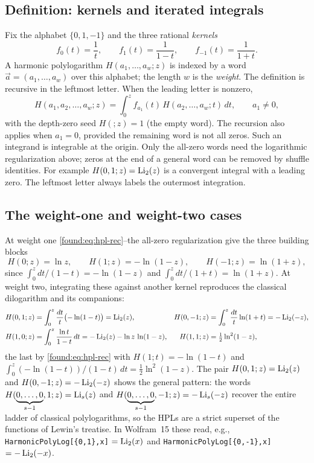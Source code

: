 \subsection{Definition: kernels and iterated integrals}

Fix the alphabet $\{0,1,-1\}$ and the three rational \emph{kernels}
\[
  f_{0}(t)=\frac1t,\qquad f_{1}(t)=\frac1{1-t},\qquad f_{-1}(t)=\frac1{1+t}.
\]
A harmonic polylogarithm $H(a_1,\dots,a_w;z)$ is indexed by a word $\vec a=(a_1,\dots,a_w)$ over this alphabet; the length $w$ is the \emph{weight}. The definition is recursive in the leftmost letter. When the leading letter is nonzero,
\begin{equation}\label{found:eq:hpl-rec}
  H(a_1,a_2,\dots,a_w;z)=\int_0^z f_{a_1}(t)\,H(a_2,\dots,a_w;t)\,dt,\qquad a_1\neq 0,
\end{equation}
with the depth-zero seed $H(;z)=1$ (the empty word). The recursion also applies when $a_1=0$, provided the remaining word
is not all zeros. Such an integrand is integrable at the origin. Only the
all-zero words need the logarithmic regularization above; zeros at the end
of a general word can be removed by shuffle identities. For example
$H(0,1;z)=\operatorname{Li}_2(z)$ is a convergent integral with a leading zero.
The leftmost letter always labels the outermost integration.

\subsection{The weight-one and weight-two cases}

At weight one \eqref{found:eq:hpl-rec}--the all-zero regularization give the three building blocks
\begin{equation}\label{found:eq:hpl-w1}
  H(0;z)=\ln z,\qquad H(1;z)=-\ln(1-z),\qquad H(-1;z)=\ln(1+z),
\end{equation}
since $\int_0^z dt/(1-t)=-\ln(1-z)$ and $\int_0^z dt/(1+t)=\ln(1+z)$. At weight two, integrating these against another kernel reproduces the classical dilogarithm and its companions:
\begin{align}
  H(0,1;z)&=\int_0^z\frac{dt}{t}\bigl(-\ln(1-t)\bigr)=\operatorname{Li}_2(z), &
  H(0,-1;z)&=\int_0^z\frac{dt}{t}\ln(1+t)=-\operatorname{Li}_2(-z),\label{found:eq:hpl-w2a}\\
  H(1,0;z)&=\int_0^z\frac{\ln t}{1-t}\,dt=-\operatorname{Li}_2(z)-\ln z\,\ln(1-z), &
  H(1,1;z)&=\tfrac12\ln^2(1-z),\label{found:eq:hpl-w2b}
\end{align}
the last by \eqref{found:eq:hpl-rec} with $H(1;t)=-\ln(1-t)$ and $\int_0^z(-\ln(1-t))/(1-t)\,dt=\tfrac12\ln^2(1-z)$. The pair $H(0,1;z)=\operatorname{Li}_2(z)$ and $H(0,-1;z)=-\operatorname{Li}_2(-z)$ shows the general pattern: the words $H(\underbrace{0,\dots,0}_{s-1},1;z)=\operatorname{Li}_s(z)$ and $H(\underbrace{0,\dots,0}_{s-1},-1;z)=-\operatorname{Li}_s(-z)$ recover the entire ladder of classical polylogarithms, so the HPLs are a strict superset of the functions of Lewin's treatise. In Wolfram~15 these read, e.g., \texttt{HarmonicPolyLog[\{0,1\},x]} $=\operatorname{Li}_2(x)$ and \texttt{HarmonicPolyLog[\{0,-1\},x]} $=-\operatorname{Li}_2(-x)$.

